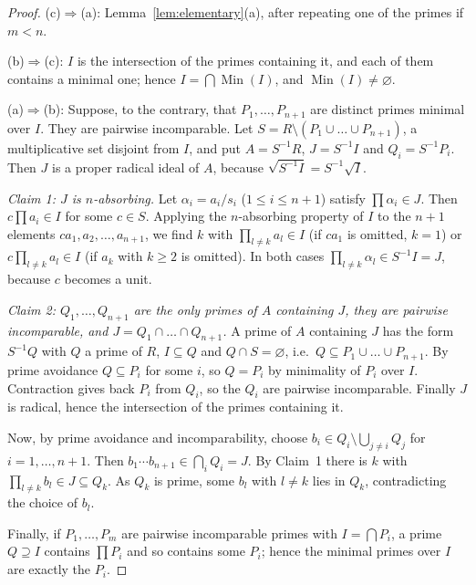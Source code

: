 \documentclass[11pt]{amsart}
\theoremstyle{definition}
\theoremstyle{remark}
\DeclareMathOperator{\Min}{Min}
\begin{document}
\begin{proof}
(c)$\Rightarrow$(a): Lemma~\ref{lem:elementary}(a), after repeating one
of the primes if $m<n$.

(b)$\Rightarrow$(c): $I$ is the intersection of the primes containing
it, and each of them contains a minimal one; hence
$I=\bigcap\Min(I)$, and $\Min(I)\ne\varnothing$.

(a)$\Rightarrow$(b): Suppose, to the contrary, that $P_1,\dots,P_{n+1}$
are distinct primes minimal over $I$. They are pairwise incomparable.
Let $S=R\setminus(P_1\cup\dots\cup P_{n+1})$, a multiplicative set
disjoint from $I$, and put $A=S^{-1}R$, $J=S^{-1}I$ and
$Q_i=S^{-1}P_i$. Then $J$ is a proper radical ideal of $A$, because
$\sqrt{S^{-1}I}=S^{-1}\sqrt I$.

\emph{Claim 1: $J$ is $n$-absorbing.} Let
$\alpha_i=a_i/s_i$ ($1\le i\le n+1$) satisfy $\prod\alpha_i\in J$. Then
$c\prod a_i\in I$ for some $c\in S$. Applying the $n$-absorbing property
of $I$ to the $n+1$ elements $ca_1,a_2,\dots,a_{n+1}$, we find $k$ with
$\prod_{l\ne k}a_l\in I$ (if $ca_1$ is omitted, $k=1$) or
$c\prod_{l\ne k}a_l\in I$ (if $a_k$ with $k\ge2$ is omitted). In both
cases $\prod_{l\ne k}\alpha_l\in S^{-1}I=J$, because $c$ becomes a unit.

\emph{Claim 2: $Q_1,\dots,Q_{n+1}$ are the only primes of $A$
containing $J$, they are pairwise incomparable, and
$J=Q_1\cap\dots\cap Q_{n+1}$.} A prime of $A$ containing $J$ has the
form $S^{-1}Q$ with $Q$ a prime of $R$, $I\subseteq Q$ and $Q\cap S=\varnothing$,
i.e.\ $Q\subseteq P_1\cup\dots\cup P_{n+1}$. By prime avoidance
$Q\subseteq P_i$ for some $i$, so $Q=P_i$ by minimality of $P_i$ over
$I$. Contraction gives back $P_i$ from $Q_i$, so the $Q_i$ are pairwise
incomparable. Finally $J$ is radical, hence the intersection of the
primes containing it.

Now, by prime avoidance and incomparability, choose
$b_i\in Q_i\setminus\bigcup_{j\ne i}Q_j$ for $i=1,\dots,n+1$. Then
$b_1\cdots b_{n+1}\in\bigcap_iQ_i=J$. By Claim~1 there is $k$ with
$\prod_{l\ne k}b_l\in J\subseteq Q_k$. As $Q_k$ is prime, some $b_l$ with
$l\ne k$ lies in $Q_k$, contradicting the choice of $b_l$.

Finally, if $P_1,\dots,P_m$ are pairwise incomparable primes with
$I=\bigcap P_i$, a prime $Q\supseteq I$ contains $\prod P_i$ and so
contains some $P_i$; hence the minimal primes over $I$ are exactly the
$P_i$.
\end{proof}
\end{document}
